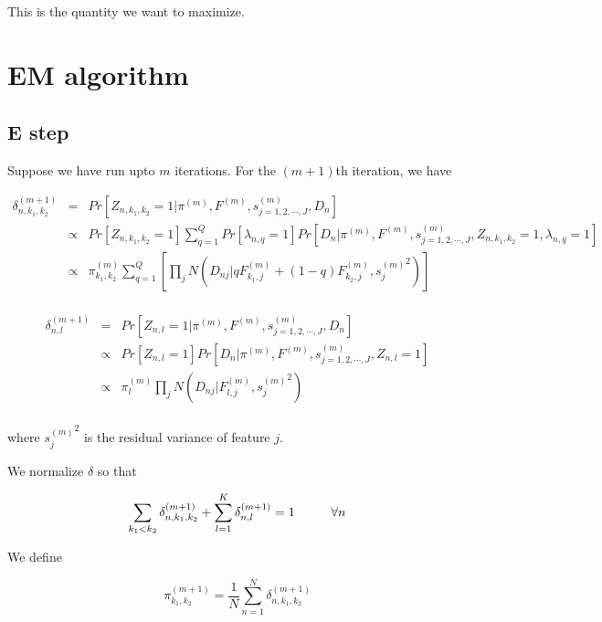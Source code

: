 \documentclass[11pt,authoryear]{article}
\begin{document}
This is the quantity we want to maximize. 

\section{EM algorithm}
\subsection{E step}

Suppose we have run upto $m$ iterations. For the $(m+1)$th iteration, we have 

\begin{eqnarray} \nonumber
\delta^{(m+1)}_{n, k_1, k_2} &=& Pr \left [ Z_{n, k_1, k_2} = 1 | \pi^{(m)}, F^{(m)}, s^{(m)}_{j=1,2,\cdots,J}, D_{n} \right ] \\ \nonumber
 &\propto& Pr \left [ Z_{n, k_1, k_2} = 1 \right] \sum_{q=1}^{Q} Pr \left [ \lambda_{n,q} = 1 \right] Pr \left [ D_{n} | \pi^{(m)}, F^{(m)}, s^{(m)}_{j=1,2,\cdots,J}, Z_{n, k_1, k_2}= 1, \lambda_{n, q}=1 \right] \\ \nonumber
 &\propto& \pi^{(m)}_{k_1,k_2} \sum_{q=1}^{Q} \left [ \prod_{j} N \left (D_{nj} | qF^{(m)}_{k_1,j} + (1-q)F^{(m)}_{k_2,j}, {s_j^{(m)}}^2 \right) \right ] \\ \nonumber
\end{eqnarray}

\begin{eqnarray} \nonumber
\delta^{(m+1)}_{n, l}  &=& Pr \left [ Z_{n, l} = 1  |  \pi^{(m)}, F^{(m)}, s^{(m)}_{j=1,2,\cdots,J}, D_{n} \right ] \\ \nonumber 
& \propto & Pr \left [ Z_{n, l} = 1 \right] Pr \left [ D_{n} | \pi^{(m)}, F^{(m)}, s^{(m)}_{j=1,2,\cdots,J}, Z_{n, l}= 1 \right] \\ \nonumber
& \propto & \pi^{(m)}_{l}  \prod_{j} N \left (D_{nj} | F^{(m)}_{l,j} , {s_j^{(m)}}^2 \right) \\  \nonumber
\end{eqnarray}


where ${s_j^{(m)}}^2$ is the residual variance of feature $j$.

We normalize $\delta$ so that 

$$ \sum_{k_1 < k_2} \delta^{(m+1)}_{n, k_1, k_2}  + \sum_{l=1}^{K} \delta^{(m+1)}_{n, l}= 1 \hspace{1 cm} \forall n $$

We define 

$$ \pi^{(m+1)}_{k_1, k_2} = \frac{1}{N}\sum_{n=1}^{N} \delta^{(m+1)}_{n, k_1, k_2} $$
\end{document}
